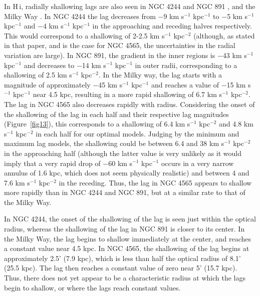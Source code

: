 \documentclass{emulateapj}
\begin{document}
\par
     In {\sc H\,i}, radially shallowing lags are also seen in  NGC 4244 \citep{2011ApJ...740...35Z} and NGC 891 \citep{2007AJ....134.1019O}, and the Milky Way \citet{2011A&A...525A.134M}.  In NGC 4244 the lag decreases from $-$9 km s$^{-1}$ kpc$^{-1}$ to $-$5 km s$^{-1}$ kpc$^{-1}$ and $-$4 km s$^{-1}$ kpc$^{-1}$ in the approaching and receding halves respectively.  This would correspond to a shallowing of 2-2.5 km s$^{-1}$ kpc$^{-2}$ (although, as stated in that paper, and is the case for NGC 4565, the uncertainties in the radial variation are large).  In NGC 891, the gradient in the inner regions is $-$43 km s$^{-1}$ kpc$^{-1}$ and decreases to $-$14 km s$^{-1}$ kpc$^{-1}$ in outer radii, corresponding to a shallowing of 2.5 km s$^{-1}$ kpc$^{-2}$.  In the Milky way, the lag starts with a magnitude of approximately  $-$45 km s$^{-1}$ kpc$^{-1}$ and reaches a value of $-$15 km s$^{-1}$ kpc$^{-1}$ near 4.5 kpc, resulting in a more rapid shallowing of 6.7 km s$^{-1}$ kpc$^{-2}$. The lag in NGC 4565 also decreases rapidly with radius.  Considering the onset of the shallowing of the lag in each half and their respective lag magnitudes (Figure~\ref{fig13}), this corresponds to a shallowing of 6.4 km s$^{-1}$ kpc$^{-2}$ and 4.8 km s$^{-1}$ kpc$^{-2}$ in each half for our optimal models.  Judging by the minimum and maximum lag models, the shallowing could be between 6.4 and 38 km s$^{-1}$ kpc$^{-2}$ in the approaching half (although the latter value is very unlikely as it would imply that a very rapid drop of $-$60 km s$^{-1}$ kpc$^{-1}$ occurs in a very narrow annulus of 1.6 kpc, which does not seem physically realistic) and between 4 and 7.6 km s$^{-1}$ kpc$^{-2}$ in the receding. Thus, the lag in NGC 4565 appears to shallow more rapidly than in NGC 4244 and NGC 891, but at a similar rate to that of the Milky Way. 

\par
   In NGC 4244, the onset of the shallowing of the lag is seen just within the optical radius, whereas the shallowing of the lag in NGC 891 is closer to its center.  In the Milky Way, the lag begins to shallow immediately at the center, and reaches a constant value near 4.5 kpc.  In NGC 4565, the shallowing of the lag begins at approximately 2.5' (7.9 kpc), which is less than half the optical radius of 8.1' (25.5 kpc).  The lag then reaches a constant value of zero near 5' (15.7 kpc).  Thus, there does not yet appear to be a characteristic radius at which the lags begin to shallow, or where the lags reach constant values.
\end{document}
